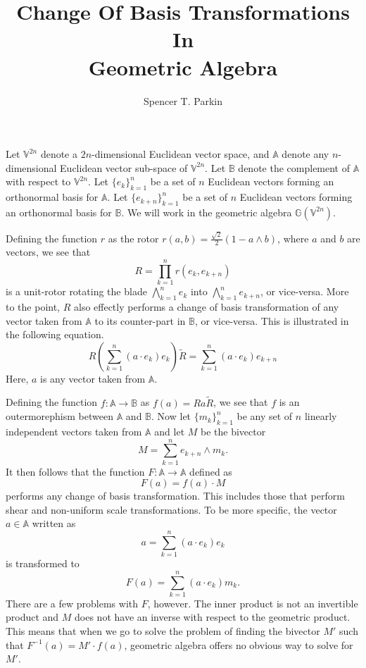 \documentclass[12pt]{article}
\title{Change Of Basis Transformations\\In\\Geometric Algebra}
\author{Spencer T. Parkin}
\newcommand{\G}{\mathbb{G}}
\newcommand{\V}{\mathbb{V}}
\newcommand{\A}{\mathbb{A}}
\newcommand{\B}{\mathbb{B}}
\begin{document}
\maketitle

Let $\V^{2n}$ denote a $2n$-dimensional Euclidean vector space, and
$\A$ denote any $n$-dimensional Euclidean vector sub-space of $\V^{2n}$.
Let $\B$ denote the complement of $\A$ with respect to $\V^{2n}$.
Let $\{e_k\}_{k=1}^n$ be a set of $n$ Euclidean vectors
forming an orthonormal basis for $\A$.  Let $\{e_{k+n}\}_{k=1}^n$
be a set of $n$ Euclidean vectors forming an orthonormal basis for $\B$.
We will work in the geometric algebra $\G(\V^{2n})$.

Defining the function $r$ as the rotor $r(a,b)=\frac{\sqrt{2}}{2}(1-a\wedge b)$, where $a$ and
$b$ are vectors, we see that
\begin{equation*}
R = \prod_{k=1}^n r(e_k,e_{k+n})
\end{equation*}
is a unit-rotor rotating the blade $\bigwedge_{k=1}^n e_k$ into $\bigwedge_{k=1}^n e_{k+n}$, or vice-versa.
More to the point, $R$ also effectly performs a change of basis transformation of any
vector taken from $\A$ to its counter-part in $\B$, or vice-versa.  This is illustrated in the
following equation.
\begin{equation*}
R\left(\sum_{k=1}^n (a\cdot e_k)e_k\right)\tilde{R} = \sum_{k=1}^n (a\cdot e_k)e_{k+n}
\end{equation*}
Here, $a$ is any vector taken from $\A$.

Defining the function $f:\A\to\B$ as $f(a)=Ra\tilde{R}$, we see that $f$ is an
outermorephism between $\A$ and $\B$.  Now let $\{m_k\}_{k=1}^n$ be any
set of $n$ linearly independent vectors taken from $\A$ and let $M$ be the
bivector
\begin{equation*}
M = \sum_{k=1}^n e_{k+n}\wedge m_k.
\end{equation*}
It then follows that the function $F:\A\to\A$ defined as
\begin{equation*}
F(a) = f(a)\cdot M
\end{equation*}
performs any change of basis transformation.  This includes those
that perform shear and non-uniform scale transformations.  To be more specific,
the vector $a\in\A$ written as
\begin{equation*}
a = \sum_{k=1}^n (a\cdot e_k)e_k
\end{equation*}
is transformed to
\begin{equation*}
F(a) = \sum_{k=1}^n (a\cdot e_k)m_k.
\end{equation*}
There are a few problems with $F$,
however.  The inner product is not an invertible product and $M$ does
not have an inverse with respect to the geometric product.  This means
that when we go to solve the problem of finding the bivector $M'$ such
that $F^{-1}(a) = M'\cdot f(a)$, geometric algebra offers no obvious
way to solve for $M'$.
\end{document}
